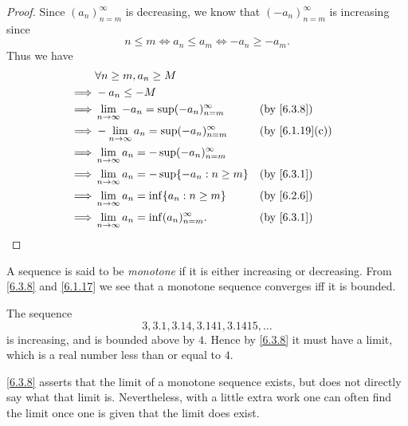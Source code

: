 \begin{proof}
  Since \((a_n)_{n = m}^\infty\) is decreasing, we know that \((-a_n)_{n = m}^\infty\) is increasing since
  \[
    n \leq m \iff a_n \leq a_m \iff -a_n \geq -a_m.
  \]
  Thus we have
  \begin{align*}
             & \forall n \geq m, a_n \geq M                                                           \\
    \implies & -a_n \leq -M                                                                           \\
    \implies & \lim_{n \to \infty} -a_n = \sup(-a_n)_{n = m}^\infty &  & \by{6.3.8}                   \\
    \implies & -\lim_{n \to \infty} a_n = \sup(-a_n)_{n = m}^\infty &  & \text{(by \cref{6.1.19}(c))} \\
    \implies & \lim_{n \to \infty} a_n = -\sup(-a_n)_{n = m}^\infty                                   \\
    \implies & \lim_{n \to \infty} a_n = -\sup\set{-a_n : n \geq m} &  & \by{6.3.1}                   \\
    \implies & \lim_{n \to \infty} a_n = \inf\set{a_n : n \geq m}   &  & \by{6.2.6}                   \\
    \implies & \lim_{n \to \infty} a_n = \inf(a_n)_{n = m}^\infty.  &  & \by{6.3.1}
  \end{align*}
\end{proof}

\begin{note}
  A sequence is said to be \emph{monotone} if it is either increasing or decreasing.
  From \cref{6.3.8} and \cref{6.1.17} we see that a monotone sequence converges iff it is bounded.
\end{note}

\begin{eg}\label{6.3.9}
  The sequence
  \[
    3, 3.1, 3.14, 3.141, 3.1415, \dots
  \]
  is increasing, and is bounded above by \(4\).
  Hence by \cref{6.3.8} it must have a limit, which is a real number less than or equal to \(4\).
\end{eg}

\begin{note}
  \cref{6.3.8} asserts that the limit of a monotone sequence exists, but does not directly say what that limit is.
  Nevertheless, with a little extra work one can often find the limit once one is given that the limit does exist.
\end{note}

